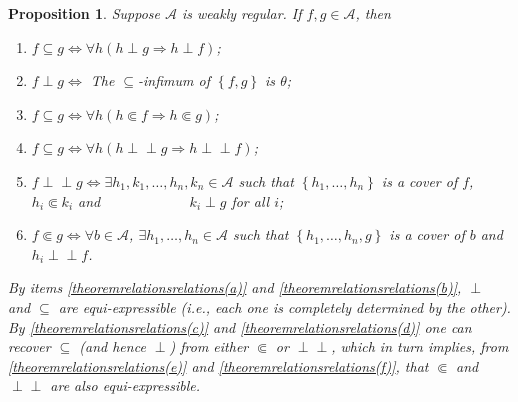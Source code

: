 \documentclass[letter,11pt]{amsart}
\theoremstyle{plain}		\newtheorem{theorem}[generalnumbering]{Theorem}
\theoremstyle{plain}		\newtheorem{corollary}[generalnumbering]{Corollary}
\theoremstyle{definition}		\newtheorem{definition}[generalnumbering]{Definition}
\theoremstyle{definition}		\newtheorem{example}[generalnumbering]{Example}
\theoremstyle{plain}		\newtheorem{proposition}[generalnumbering]{Proposition}
\theoremstyle{plain}		\newtheorem{lemma}[generalnumbering]{Lemma}
\theoremstyle{definition}
\newcommand{\perpp}{\perp\!\!\!\perp}
\begin{document}
\begin{proposition}\label{propositionrelationsrelations}
	Suppose $\mathcal{A}$ is weakly regular. If $f,g\in\mathcal{A}$, then
	\begin{enumerate}[label=(\alph*)]
		\item\label{theoremrelationsrelations(a)} $f\subseteq g\iff\forall h(h\perp g\Rightarrow h\perp f)$;
		\item\label{theoremrelationsrelations(b)} $f\perp g\iff$ The $\subseteq$-infimum of $\left\{f,g\right\}$ is $\theta$;
		\item\label{theoremrelationsrelations(c)} $f\subseteq g\iff\forall h(h\Subset f\Rightarrow h\Subset g)$;
		\item\label{theoremrelationsrelations(d)} $f\subseteq g\iff\forall h(h\perpp g\Rightarrow h\perpp f)$;
		\item\label{theoremrelationsrelations(e)} $f\perpp g\iff\exists h_1,k_1,\ldots,h_n,k_n\in\mathcal{A}$ such that $\left\{h_1,\ldots,h_n\right\}$ is a cover of $f$, $h_i\Subset k_i$ and $\phantom{f\perpp g\iff...}k_i\perp g$ for all $i$;
		\item\label{theoremrelationsrelations(f)} $f\Subset g\iff\forall b\in\mathcal{A}$, $\exists h_1,\ldots,h_n\in\mathcal{A}$ such that $\left\{h_1,\ldots,h_n,g\right\}$ is a cover of $b$ and $h_i\perpp f$.
	\end{enumerate}
	By items \ref{theoremrelationsrelations(a)} and \ref{theoremrelationsrelations(b)}, $\perp$ and $\subseteq$ are equi-expressible (i.e., each one is completely determined by the other). By \ref{theoremrelationsrelations(c)} and \ref{theoremrelationsrelations(d)} one can recover $\subseteq$ (and hence $\perp$) from either $\Subset$ or $\perpp$, which in turn implies, from \ref{theoremrelationsrelations(e)} and \ref{theoremrelationsrelations(f)}, that $\Subset$ and $\perpp$ are also equi-expressible.
\end{proposition}
\end{document}
